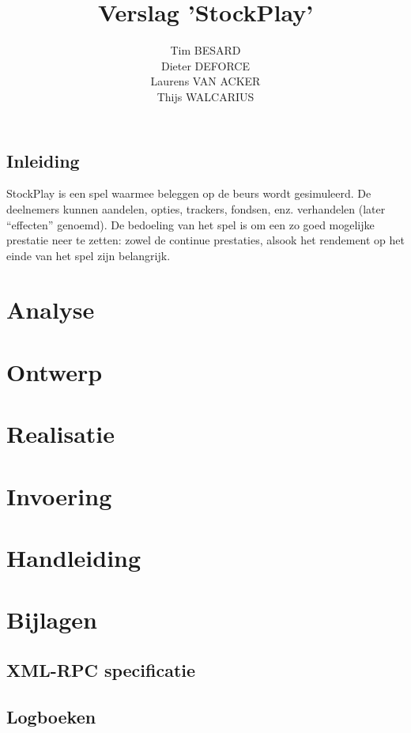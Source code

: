 \documentclass[a4paper,oneside,final]{memoir}
\title{Verslag 'StockPlay'}
\author{
Tim BESARD\\
Dieter DEFORCE\\
Laurens VAN ACKER\\
Thijs WALCARIUS
}
\begin{document}
\maketitle
{}
\tableofcontents
{}


%
%

\chapter*{Inleiding}
StockPlay is een spel waarmee beleggen op de beurs wordt gesimuleerd. De deelnemers kunnen aandelen, opties, trackers, fondsen, enz. verhandelen (later ``effecten'' genoemd). De bedoeling van het spel is om een zo goed mogelijke prestatie neer te zetten: zowel de continue prestaties, alsook het rendement op het einde van het spel zijn belangrijk.

\part{Analyse}
\label{pt:analyse}


\part{Ontwerp}
\label{pt:ontwerp}


\part{Realisatie}
\label{pt:realisatie}


\part{Invoering}
\label{pt:invoering}


\part{Handleiding}
\label{pt:handleiding}


%
%

\part{Bijlagen}
\label{pt:bijlagen}
\appendix

\chapter{XML-RPC specificatie}


\chapter{Logboeken}

\end{document}
